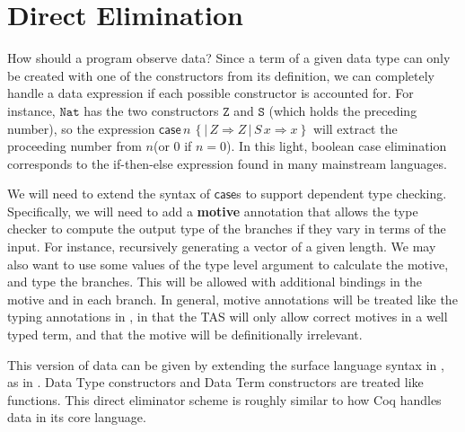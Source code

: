 \section{Direct Elimination}

How should a program observe data?
Since a term of a given data type can only be created with one of the constructors from its definition, we can completely handle a data expression if each possible constructor is accounted for.
For instance, $\mathtt{Nat}$ has the two constructors $\mathtt{Z}$ and $\mathtt{S}$ (which holds the preceding number), so the expression $\mathsf{case}\,n\,\left\{ |\,Z\Rightarrow Z\,|\,S\,x\Rightarrow x\right\}$ will extract the proceeding number from $n$(or $0$ if $n=0$).
In this light, boolean case elimination corresponds to the if-then-else expression found in many mainstream languages. 

We will need to extend the syntax of $\mathsf{case}$s to support dependent type checking.
Specifically, we will need to add a \textbf{motive} annotation that allows the type checker to compute the output type of the branches if they vary in terms of the input.
For instance, recursively generating a vector of a given length.
We may also want to use some values of the type level argument to calculate the motive, and type the branches.
This will be allowed with additional bindings in the motive and in each branch.
In general, motive annotations will be treated like the typing annotations in , in that the \ac{TAS} will only allow correct motives in a well typed term, and that the motive will be definitionally irrelevant.

This version of data can be given by extending the surface language syntax in , as in .
Data Type constructors and Data Term constructors are treated like functions.
This direct eliminator scheme is roughly similar to how Coq handles data in its core language.

